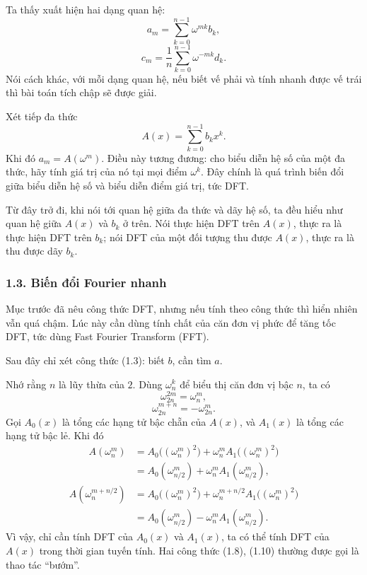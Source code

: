 \documentclass[11pt]{article}
\begin{document}
Ta thấy xuất hiện hai dạng quan hệ:
\[
  a_m=\sum_{k=0}^{n-1}\omega^{mk}b_k, \tag{1.3}
\]
\[
  c_m=\frac{1}{n}\sum_{k=0}^{n-1}\omega^{-mk}d_k. \tag{1.4}
\]
Nói cách khác, với mỗi dạng quan hệ, nếu biết vế phải và tính nhanh được vế
trái thì bài toán tích chập sẽ được giải.

Xét tiếp đa thức
\[
  A(x)=\sum_{k=0}^{n-1}b_kx^k.
\]
Khi đó \(a_m=A(\omega^m)\). Điều này tương đương: cho biểu diễn hệ số của một
đa thức, hãy tính giá trị của nó tại mọi điểm \(\omega^k\). Đây chính là quá
trình biến đổi giữa biểu diễn hệ số và biểu diễn điểm giá trị, tức DFT.

Từ đây trở đi, khi nói tới quan hệ giữa đa thức và dãy hệ số, ta đều hiểu như
quan hệ giữa \(A(x)\) và \(b_k\) ở trên. Nói thực hiện DFT trên \(A(x)\), thực
ra là thực hiện DFT trên \(b_k\); nói DFT của một đối tượng thu được \(A(x)\),
thực ra là thu được dãy \(b_k\).

\subsubsection*{1.3. Biến đổi Fourier nhanh}

Mục trước đã nêu công thức DFT, nhưng nếu tính theo công thức thì hiển nhiên
vẫn quá chậm. Lúc này cần dùng tính chất của căn đơn vị phức để tăng tốc DFT,
tức dùng Fast Fourier Transform (FFT).

Sau đây chỉ xét công thức (1.3): biết \(b\), cần tìm \(a\).

Nhớ rằng \(n\) là lũy thừa của \(2\). Dùng \(\omega_n^k\) để biểu thị căn đơn
vị bậc \(n\), ta có
\[
  \omega_{2n}^{2m}=\omega_n^m, \tag{1.5}
\]
\[
  \omega_{2n}^{m+n}=-\omega_{2n}^{m}. \tag{1.6}
\]
Gọi \(A_0(x)\) là tổng các hạng tử bậc chẵn của \(A(x)\), và \(A_1(x)\) là
tổng các hạng tử bậc lẻ. Khi đó
\begin{align*}
A(\omega_n^m)
  &= A_0\bigl((\omega_n^m)^2\bigr)
     +\omega_n^m A_1\bigl((\omega_n^m)^2\bigr) \tag{1.7}\\
  &= A_0(\omega_{n/2}^m)+\omega_n^m A_1(\omega_{n/2}^m), \tag{1.8}
\end{align*}
\begin{align*}
A(\omega_n^{m+n/2})
  &= A_0\bigl((\omega_n^m)^2\bigr)
     +\omega_n^{m+n/2} A_1\bigl((\omega_n^m)^2\bigr) \tag{1.9}\\
  &= A_0(\omega_{n/2}^m)-\omega_n^m A_1(\omega_{n/2}^m). \tag{1.10}
\end{align*}
Vì vậy, chỉ cần tính DFT của \(A_0(x)\) và \(A_1(x)\), ta có thể tính DFT của
\(A(x)\) trong thời gian tuyến tính. Hai công thức (1.8), (1.10) thường được
gọi là thao tác ``bướm''.
\end{document}
